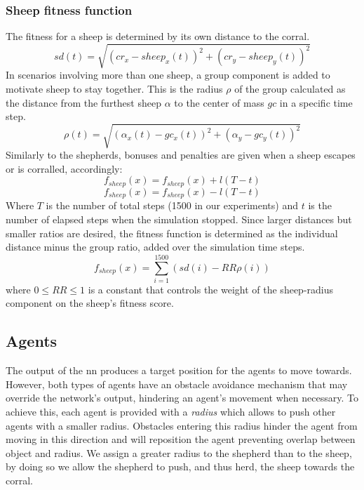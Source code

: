 \documentclass[conference]{IEEEtran}
\begin{document}
\subsubsection{Sheep fitness function}
The fitness for a sheep is determined by its own distance to the corral. 
\begin{equation} \label{eq:sheep_dist}
sd(t) = \sqrt{(cr_x - sheep_x(t))^2 + (cr_y - sheep_y(t))^2}
\end{equation}
In scenarios involving more than one sheep, a group component is added to motivate sheep to stay together. 
This is the radius $\rho$ of the group calculated as the distance from the furthest sheep $\alpha$ to the center of mass $gc$ in a specific time step.
\begin{equation} \label{eq:sheep_ratio}
\rho(t) = \sqrt{(\alpha_x(t) - gc_x(t))^2 + (\alpha_y - gc_y(t))^2}
\end{equation}
Similarly to the shepherds, bonuses and penalties are given when a sheep escapes or is corralled, accordingly:
\begin{equation} \label{eq:sheep_bonus}
f_{sheep}(x) = f_{sheep}(x) + l (T - t)
\end{equation}
\begin{equation} \label{eq:sheep_pen}
f_{sheep}(x) = f_{sheep}(x) - l (T - t)
\end{equation}
Where $T$ is the number of total steps (1500 in our experiments) and $t$ is the number of elapsed steps when the simulation stopped.
Since larger distances but smaller ratios are desired, the fitness function is determined as the individual distance minus the group ratio, added over the simulation time steps. 
\begin{equation} \label{eq:sheep_fitness}
f_{sheep}(x) = \sum_{i=1}^{1500}(sd(i) - {RR} \rho(i))
\end{equation}
where $0 \leq RR \leq 1$ is a constant that controls the weight of the sheep-radius component on the sheep's fitness score.


\subsection{Agents}
\label{sec:agents_design}
The output of the \gls{nn} produces a target position for the agents to move towards.
However, both types of agents have an obstacle avoidance mechanism that may override the network's output, hindering an agent's movement when necessary.
To achieve this, each agent is provided with a \textit{radius} which allows to push other agents with a smaller radius.
Obstacles entering this radius hinder the agent from moving in this direction and will reposition the agent preventing overlap between object and radius.
We assign a greater radius to the shepherd than to the sheep, by doing so we allow the shepherd to push, and thus herd, the sheep towards the corral.
\end{document}
